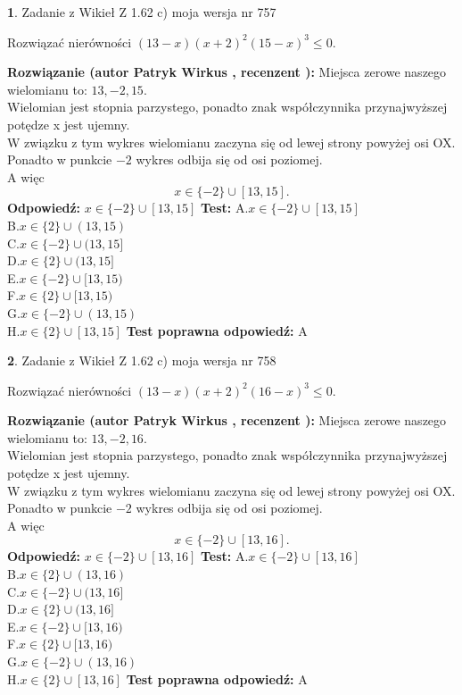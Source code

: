 \documentclass[12pt, a4paper]{article}
\theoremstyle{definition} %
\newtheorem{zad}{}
\newcommand{\zadStart}[1]{\begin{zad}#1\newline}
\newcommand{\zadStop}{\end{zad}}
\newcommand{\rozwStart}[2]{\noindent \textbf{Rozwiązanie (autor #1 , recenzent #2): }\newline}
\newcommand{\rozwStop}{\newline}
\newcommand{\odpStart}{\noindent \textbf{Odpowiedź:}\newline}
\newcommand{\odpStop}{\newline}
\newcommand{\testStart}{\noindent \textbf{Test:}\newline}
\newcommand{\testStop}{\newline}
\newcommand{\kluczStart}{\noindent \textbf{Test poprawna odpowiedź:}\newline}
\newcommand{\kluczStop}{\newline}
\begin{document}
\zadStart{Zadanie z Wikieł Z 1.62 c) moja wersja nr 757}

Rozwiązać nierówności $(13-x)(x+2)^{2}(15-x)^{3}\le0$.
\zadStop
\rozwStart{Patryk Wirkus}{}
Miejsca zerowe naszego wielomianu to: $13, -2, 15$.\\
Wielomian jest stopnia parzystego, ponadto znak współczynnika przy\linebreak najwyższej potędze x jest ujemny.\\ W związku z tym wykres wielomianu zaczyna się od lewej strony powyżej osi OX.\\
Ponadto w punkcie $-2$ wykres odbija się od osi poziomej.\\
A więc $$x \in \{-2\} \cup [13,15].$$
\rozwStop
\odpStart
$x \in \{-2\} \cup [13,15]$
\odpStop
\testStart
A.$x \in \{-2\} \cup [13,15]$\\
B.$x \in \{2\} \cup (13,15)$\\
C.$x \in \{-2\} \cup (13,15]$\\
D.$x \in \{2\} \cup (13,15]$\\
E.$x \in \{-2\} \cup [13,15)$\\
F.$x \in \{2\} \cup [13,15)$\\
G.$x \in \{-2\} \cup (13,15)$\\
H.$x \in \{2\} \cup [13,15]$
\testStop
\kluczStart
A
\kluczStop



\zadStart{Zadanie z Wikieł Z 1.62 c) moja wersja nr 758}

Rozwiązać nierówności $(13-x)(x+2)^{2}(16-x)^{3}\le0$.
\zadStop
\rozwStart{Patryk Wirkus}{}
Miejsca zerowe naszego wielomianu to: $13, -2, 16$.\\
Wielomian jest stopnia parzystego, ponadto znak współczynnika przy\linebreak najwyższej potędze x jest ujemny.\\ W związku z tym wykres wielomianu zaczyna się od lewej strony powyżej osi OX.\\
Ponadto w punkcie $-2$ wykres odbija się od osi poziomej.\\
A więc $$x \in \{-2\} \cup [13,16].$$
\rozwStop
\odpStart
$x \in \{-2\} \cup [13,16]$
\odpStop
\testStart
A.$x \in \{-2\} \cup [13,16]$\\
B.$x \in \{2\} \cup (13,16)$\\
C.$x \in \{-2\} \cup (13,16]$\\
D.$x \in \{2\} \cup (13,16]$\\
E.$x \in \{-2\} \cup [13,16)$\\
F.$x \in \{2\} \cup [13,16)$\\
G.$x \in \{-2\} \cup (13,16)$\\
H.$x \in \{2\} \cup [13,16]$
\testStop
\kluczStart
A
\kluczStop
\end{document}
